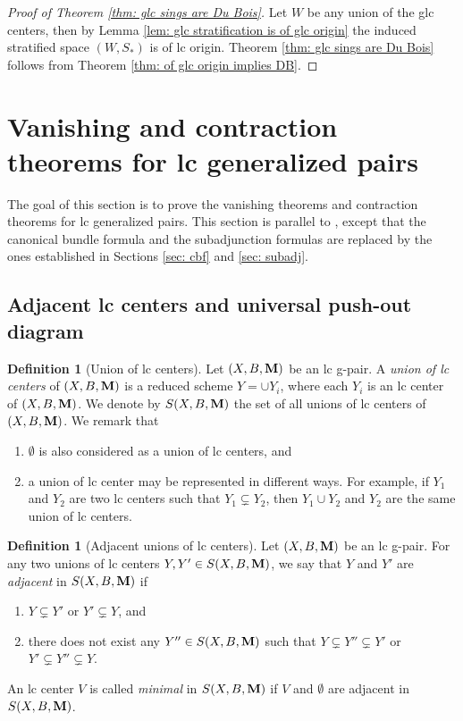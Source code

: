 \documentclass[11pt]{amsart}
\numberwithin{equation}{section}
\newcommand{\Mm}{{\bf{M}}}
\theoremstyle{definition}
\newtheorem{defn}[thm]{Definition}
\theoremstyle{definition}
\theoremstyle{definition}
\begin{document}
\begin{proof}[Proof of Theorem \ref{thm: glc sings are Du Bois}]
   Let $W$ be any union of the glc centers, then by Lemma \ref{lem: glc stratification is of glc origin} the induced stratified space $(W,S_*)$ is of lc origin. Theorem \ref{thm: glc sings are Du Bois} follows from Theorem \ref{thm: of glc origin implies DB}.
\end{proof}


\section{Vanishing and contraction theorems for lc generalized pairs}\label{sec: vanishing gpair}

The goal of this section is to prove the vanishing theorems and contraction theorems for lc generalized pairs. This section is parallel to \cite{CLX23}, except that the canonical bundle formula and the subadjunction formulas are replaced by the ones established in Sections \ref{sec: cbf} and \ref{sec: subadj}.

\subsection{Adjacent lc centers and universal push-out diagram}

\begin{defn}[Union of lc centers] Let $(X,B,\Mm)$ be an lc g-pair. A \emph{union of lc centers} of $(X,B,\Mm)$ is a reduced scheme $Y=\cup Y_i$, where each $Y_i$ is an lc center of $(X,B,\Mm)$. We denote by $S(X,B,\Mm)$ the set of all unions of lc centers of $(X,B,\Mm)$. We remark that 
\begin{enumerate}
    \item $\emptyset$ is also considered as a union of lc centers, and
    \item a union of lc center may be represented in different ways. For example, if $Y_1$ and $Y_2$ are two lc centers such that $Y_1\subsetneq Y_2$, then $Y_1\cup Y_2$ and $Y_2$ are the same union of lc centers.
\end{enumerate}
\end{defn}


\begin{defn}[Adjacent unions of lc centers]
Let $(X,B,\Mm)$ be an lc g-pair. For any two unions of lc centers $Y,Y'\in S(X,B,\Mm)$, we say that $Y$ and $Y'$ are \emph{adjacent} in $S(X,B,\Mm)$ if
\begin{enumerate}
    \item $Y\subsetneq Y'$ or $Y'\subsetneq Y$, and
    \item there does not exist any $Y''\in S(X,B,\Mm)$ such that $Y\subsetneq Y'' \subsetneq Y'$ or $Y'\subsetneq Y''\subsetneq Y$. 
\end{enumerate}
An lc center $V$ is called \emph{minimal} in $S(X,B,\Mm)$ if $V$ and $\emptyset$ are adjacent in $S(X,B,\Mm)$.
\end{defn}
\end{document}
